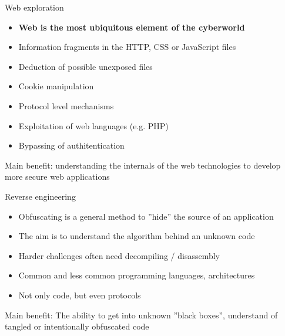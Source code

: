 \documentclass[12 pt]{beamer}
\begin{document}

\begin{frame}{Web exploration}

  \begin{itemize}
    \item{\textbf{Web is the most ubiquitous element of the cyberworld}}
    \item{Information fragments in the HTTP, CSS or JavaScript files}
    \item{Deduction of possible unexposed files}
    \item{Cookie manipulation}
    \item{Protocol level mechanisms}
    \item{Exploitation of web languages (e.g. PHP)}
    \item{Bypassing of authitentication}
  \end{itemize}

  \begin{exampleblock}{}
    Main benefit: understanding the internals of the web technologies to develop more secure web applications
  \end{exampleblock}
\end{frame}


\begin{frame}{Reverse engineering}

  \begin{itemize}
    \item{Obfuscating is a general method to ''hide'' the source of an application}
    \item{The aim is to understand the algorithm behind an unknown code}
    \item{Harder challenges often need decompiling / disassembly}
    \item{Common and less common programming languages, architectures}
    \item{Not only code, but even protocols}
  \end{itemize}

  \begin{exampleblock}{}
    Main benefit: The ability to get into unknown ''black boxes'', understand of tangled or intentionally obfuscated code
  \end{exampleblock}

\end{frame}
\end{document}
